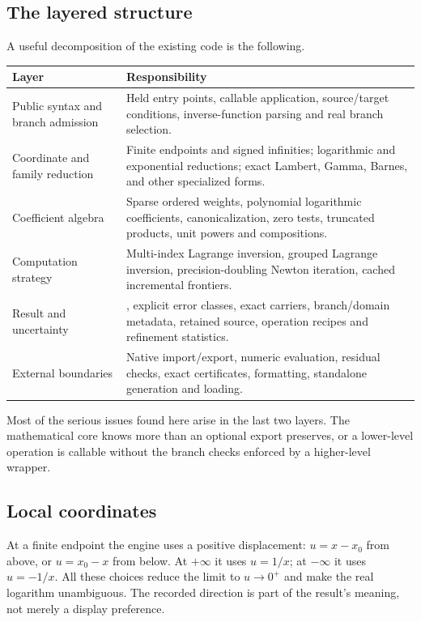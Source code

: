 \documentclass[11pt,a4paper]{article}
\newcommand{\code}[1]{\texttt{\detokenize{#1}}}
\begin{document}
\subsection{The layered structure}
A useful decomposition of the existing code is the following.\cite{main,operations,arithmetic,expressions,development}
\begin{longtable}{@{}p{}p{}@{}}
\toprule
Layer & Responsibility\\\midrule\endhead
Public syntax and branch admission & Held entry points, callable application, source/target conditions, inverse-function parsing and real branch selection.\\
Coordinate and family reduction & Finite endpoints and signed infinities; logarithmic and exponential reductions; exact Lambert, Gamma, Barnes, and other specialized forms.\\
Coefficient algebra & Sparse ordered weights, polynomial logarithmic coefficients, canonicalization, zero tests, truncated products, unit powers and compositions.\\
Computation strategy & Multi-index Lagrange inversion, grouped Lagrange inversion, precision-doubling Newton iteration, cached incremental frontiers.\\
Result and uncertainty & \code{GeneralizedSeries}, explicit error classes, exact carriers, branch/domain metadata, retained source, operation recipes and refinement statistics.\\
External boundaries & Native \code{Series} import/export, numeric evaluation, residual checks, exact certificates, formatting, standalone generation and loading.\\
\bottomrule
\end{longtable}

Most of the serious issues found here arise in the last two layers. The mathematical core knows more than an optional export preserves, or a lower-level operation is callable without the branch checks enforced by a higher-level wrapper.

\subsection{Local coordinates}
At a finite endpoint the engine uses a positive displacement: $u=x-x_0$ from above, or $u=x_0-x$ from below. At $+\infty$ it uses $u=1/x$; at $-\infty$ it uses $u=-1/x$. All these choices reduce the limit to $u\to0^+$ and make the real logarithm unambiguous. The recorded direction is part of the result's meaning, not merely a display preference.\cite{main}
\end{document}
